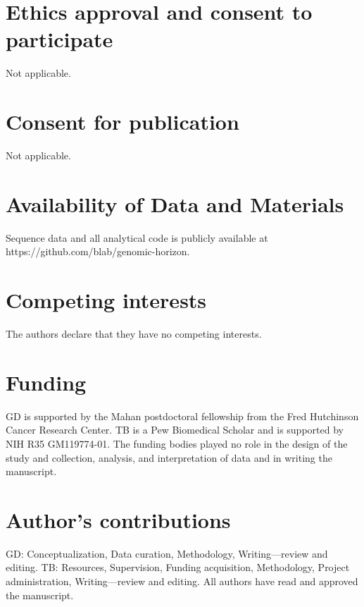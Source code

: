 \documentclass{bmcart}
\begin{document}
\begin{backmatter}
\section*{Ethics approval and consent to participate}
Not applicable.

\section*{Consent for publication}
Not applicable.

\section*{Availability of Data and Materials}
Sequence data and all analytical code is publicly available at https://github.com/blab/genomic-horizon.

\section*{Competing interests}
The authors declare that they have no competing interests.

\section*{Funding}
GD is supported by the Mahan postdoctoral fellowship from the Fred Hutchinson Cancer Research Center.
TB is a Pew Biomedical Scholar and is supported by NIH R35 GM119774-01.
The funding bodies played no role in the design of the study and collection, analysis, and interpretation of data and in writing the manuscript.

\section*{Author's contributions}
GD: Conceptualization, Data curation, Methodology, Writing—review and editing.
TB: Resources, Supervision, Funding acquisition, Methodology, Project administration, Writing—review and editing.
All authors have read and approved the manuscript.


\end{backmatter}
\end{document}
